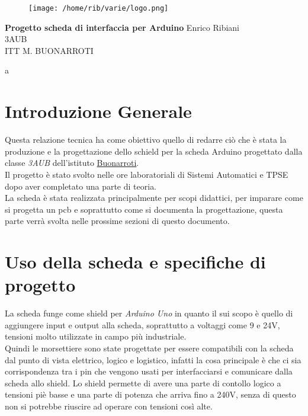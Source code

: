 \documentclass{article}
\begin{document}
    \begin{titlepage}
\begin{flushleft}
\begin{figure}[h]
    \centering
    \texttt{[image: /home/rib/varie/logo.png]}
\end{figure}
\vspace{2\baselineskip}
\Huge{\textbf{Progetto scheda di interfaccia per Arduino}}
\vfill
\LARGE Enrico Ribiani\\
\LARGE 3AUB\\
\vfill
\huge{ITT M. BUONARROTI }

\end{flushleft}
\end{titlepage}
\pagestyle{fancy}
\fancyhead{}
a
\cfoot{\thepage}
\tableofcontents
{}
\vskip 3cm
\section{Introduzione Generale}
Questa relazione tecnica ha come obiettivo quello di redarre ciò che è stata la produzione e la progettazione dello schield per la scheda 
Arduino progettato dalla classe \textit{3AUB} dell'istituto \href{https://www.buonarroti.tn.it/}{Buonarroti}.\\
Il progetto è stato svolto nelle ore laboratoriali di Sistemi Automatici e TPSE dopo aver completato una parte di teoria.\\
La scheda è stata realizzata principalmente per scopi didattici, per imparare come si progetta un pcb e soprattutto come si documenta la progettazione, questa parte verrà svolta
nelle prossime sezioni di questo documento.\\
\section{Uso della scheda e specifiche di progetto}
La scheda funge come shield per \textit{Arduino Uno} in quanto il sui scopo è quello di aggiungere input e output alla scheda, soprattutto 
a voltaggi come 9 e 24V, tensioni molto utilizzate in campo più industriale.\\
Quindi le morsettiere sono state progettate per essere compatibili con la scheda dal punto di vista elettrico, logico e logistico, infatti la cosa principale è che 
ci sia corrispondenza tra i pin che vengono usati per interfacciarsi e comunicare dalla scheda allo shield.
Lo shield permette di avere una parte di contollo logico a tensioni piè basse e una parte di potenza che arriva fino a 240V, senza di questo non si potrebbe riuscire ad operare con 
tensioni così alte.
\end{document}

